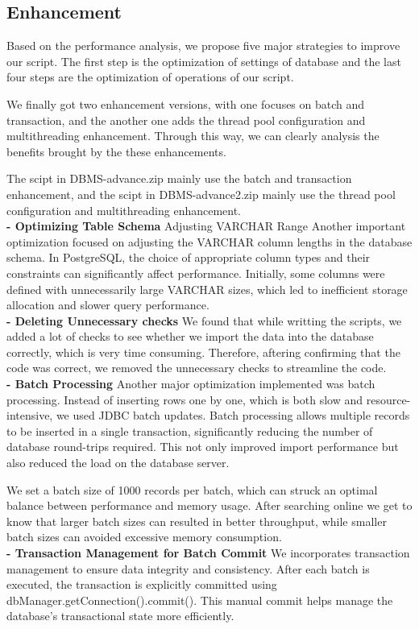 \documentclass{article}
\begin{document}
\subsection{Enhancement}
Based on the performance analysis, we propose five major strategies to improve our script. The first step is the optimization of settings of database and the last four steps are the optimization of operations of our script.

We finally got two enhancement versions, with one focuses on batch and transaction, and the another one adds the thread pool configuration and multithreading enhancement. Through this way, we can clearly analysis the benefits brought by the these enhancements.

 The scipt in DBMS-advance.zip mainly use the batch and transaction enhancement, and the scipt in DBMS-advance2.zip mainly use the thread pool configuration and multithreading enhancement.
\vspace{6pt}
\\
\textbf{- Optimizing Table Schema}  Adjusting VARCHAR Range
Another important optimization focused on adjusting the VARCHAR column lengths in the database schema. In PostgreSQL, the choice of appropriate column types and their constraints can significantly affect performance. Initially, some columns were defined with unnecessarily large VARCHAR sizes, which led to inefficient storage allocation and slower query performance.
\vspace{6pt}
\\
\textbf{- Deleting Unnecessary checks}  We found that while writting the scripts, we added a lot of checks to see whether we import the data into the database correctly, which is very time consuming. Therefore, aftering confirming that the code was correct, we removed the unnecessary checks to streamline the code.
\vspace{6pt}
\\
\textbf{- Batch Processing}  Another major optimization implemented was batch processing. Instead of inserting rows one by one, which is both slow and resource-intensive, we used JDBC batch updates. Batch processing allows multiple records to be inserted in a single transaction, significantly reducing the number of database round-trips required. This not only improved import performance but also reduced the load on the database server.

We set a batch size of 1000 records per batch, which can struck an optimal balance between performance and memory usage. After searching online we get to know that larger batch sizes can resulted in better throughput, while smaller batch sizes can avoided excessive memory consumption.
\vspace{6pt}
\\
\textbf{- Transaction Management for Batch Commit}  We incorporates transaction management to ensure data integrity and consistency. After each batch is executed, the transaction is explicitly committed using dbManager.getConnection().commit(). This manual commit helps manage the database’s transactional state more efficiently.
\end{document}
